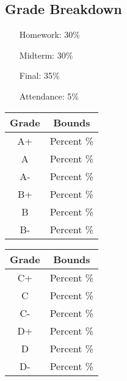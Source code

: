 \documentclass[11pt,fleqn,openany]{book} %
\begin{document}
\subsection{Grade Breakdown}
\begin{multicols}{3}
\begin{itemize}[leftmargin=1cm]
\item[Homework:]  30\%
\item[Midterm:] 30\%
\item[Final:] 35\%
\item[Attendance:] 5\%
\end{itemize}

\begin{tabular}{|c|c|} 
\hline
   Grade & Bounds  \\
\hline
  A+ & Percent \% \\ 
  A & Percent \%  \\
  A- & Percent \% \\ 
  B+ & Percent \% \\ 
  B & Percent \%  \\ 
  B- & Percent \% \\ 

\hline
\end{tabular}

\begin{tabular}{|c|c|} 
\hline
   Grade & Bounds  \\
\hline
  C+ & Percent \% \\ 
  C & Percent \%  \\
  C- & Percent \% \\ 
  D+ & Percent \% \\ 
  D & Percent \%  \\ 
  D- & Percent \% \\ 

\hline
\end{tabular}

\end{multicols}
\end{document}
